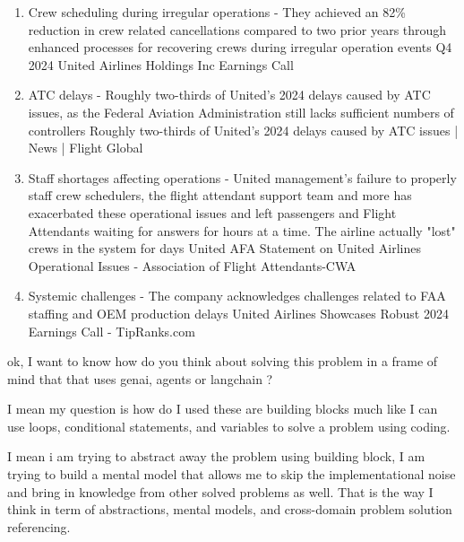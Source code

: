 \begin{botresponse}
\begin{enumerate}
\item Crew scheduling during irregular operations - They achieved an 82\% reduction in crew related cancellations compared to two prior years through enhanced processes for recovering crews during irregular operation events Q4 2024 United Airlines Holdings Inc Earnings Call
\item ATC delays - Roughly two-thirds of United's 2024 delays caused by ATC issues, as the Federal Aviation Administration still lacks sufficient numbers of controllers Roughly two-thirds of United’s 2024 delays caused by ATC issues | News | Flight Global
\item Staff shortages affecting operations - United management's failure to properly staff crew schedulers, the flight attendant support team and more has exacerbated these operational issues and left passengers and Flight Attendants waiting for answers for hours at a time. The airline actually "lost" crews in the system for days United AFA Statement on United Airlines Operational Issues - Association of Flight Attendants-CWA
\item Systemic challenges - The company acknowledges challenges related to FAA staffing and OEM production delays United Airlines Showcases Robust 2024 Earnings Call - TipRanks.com
\end{enumerate}
\end{botresponse}

\begin{userprompt}
ok, I want to know how do you think about solving this problem in a frame of mind that that uses genai, agents or langchain ?

I mean my question is how do I used these are building blocks much like I can use loops, conditional statements, and variables to solve a problem using coding.

I mean i am trying to abstract away the problem using building block, I am trying to build a mental model that allows me to skip the implementational noise and bring in knowledge from other solved problems as well. That is the way I think in term of abstractions, mental models, and cross-domain problem solution referencing.
\end{userprompt}

